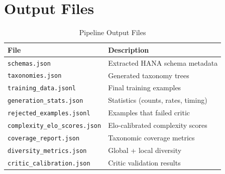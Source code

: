 \section{Output Files}

\begin{table}[H]
\centering
\caption{Pipeline Output Files}
\label{tab:outputs}
\begin{tabularx}{\textwidth}{lX}
\toprule
\textbf{File} & \textbf{Description} \\
\midrule
\texttt{schemas.json} & Extracted HANA schema metadata \\
\texttt{taxonomies.json} & Generated taxonomy trees \\
\texttt{training\_data.jsonl} & Final training examples \\
\texttt{generation\_stats.json} & Statistics (counts, rates, timing) \\
\texttt{rejected\_examples.jsonl} & Examples that failed critic \\
\texttt{complexity\_elo\_scores.json} & Elo-calibrated complexity scores \\
\texttt{coverage\_report.json} & Taxonomic coverage metrics \\
\texttt{diversity\_metrics.json} & Global + local diversity \\
\texttt{critic\_calibration.json} & Critic validation results \\
\bottomrule
\end{tabularx}
\end{table}

\newpage